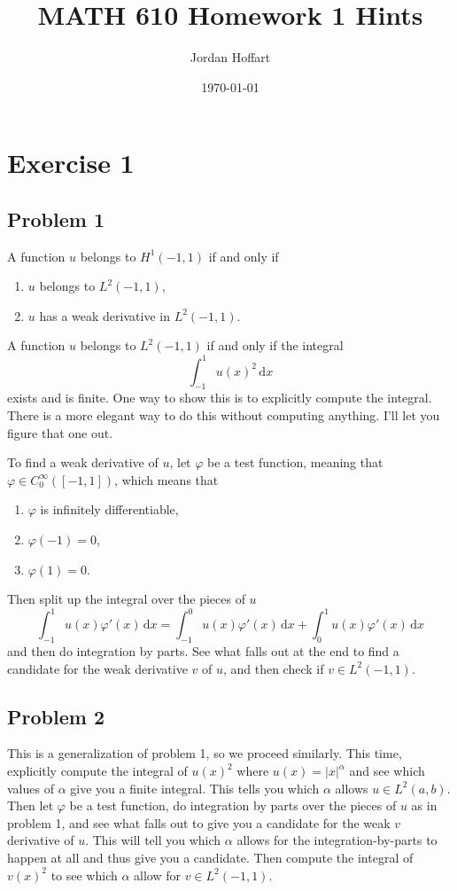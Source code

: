 \documentclass{article}
\title{MATH 610 Homework 1 Hints}
\author{Jordan Hoffart}
\date{\today}
\theoremstyle{definition}
\theoremstyle{plain}
\renewcommand{\d}{\mathrm d}
\begin{document}
\maketitle

\section{Exercise 1}

\subsection{Problem 1}
A function $u$ belongs to $H^1(-1,1)$ if and only if
\begin{enumerate}
  \item $u$ belongs to $L^2(-1,1)$,
  \item $u$ has a weak derivative in $L^2(-1,1)$.
\end{enumerate}
A function $u$ belongs to $L^2(-1,1)$ if and only if the integral 
\begin{equation}
  \int_{-1}^1u(x)^2\,\d x
\end{equation}
exists and is finite.
One way to show this is to explicitly compute the integral.
There is a more elegant way to do this without computing anything.
I'll let you figure that one out.

To find a weak derivative of $u$, let $\varphi$ be a test function, meaning that $\varphi \in C_0^\infty([-1,1])$, which means that 
\begin{enumerate}
  \item $\varphi$ is infinitely differentiable,
  \item $\varphi(-1) = 0$,
  \item $\varphi(1) = 0$.
\end{enumerate}
Then split up the integral over the pieces of $u$
\begin{equation}
  \int_{-1}^1u(x)\varphi'(x)\,\d x = \int_{-1}^0u(x)\varphi'(x)\,\d x + \int_0^1u(x)\varphi'(x)\,\d x
\end{equation}
and then do integration by parts.
See what falls out at the end to find a candidate for the weak derivative $v$ of $u$, and then check if $v \in L^2(-1,1)$.

\subsection{Problem 2}
This is a generalization of problem 1, so we proceed similarly.
This time, explicitly compute the integral of $u(x)^2$ where $u(x) = |x|^{\alpha}$ and see which values of $\alpha$ give you a finite integral.
This tells you which $\alpha$ allows $u \in L^2(a,b)$.
Then let $\varphi$ be a test function, do integration by parts over the pieces of $u$ as in problem 1, and see what falls out to give you a candidate for the weak $v$ derivative of $u$.
This will tell you which $\alpha$ allows for the integration-by-parts to happen at all and thus give you a candidate.
Then compute the integral of $v(x)^2$ to see which $\alpha$ allow for $v \in L^2(-1,1)$.
\end{document}
